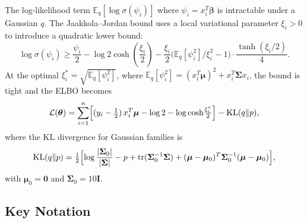 \documentclass[11pt,a4paper]{article}
\newcommand{\E}{\mathbb{E}}
\newcommand{\tr}{\text{tr}}
\begin{document}
The log-likelihood term $\E_q[\log\sigma(\psi_i)]$ where $\psi_i = x_i^T\bm{\beta}$
is intractable under a Gaussian $q$.
The Jaakkola--Jordan bound uses a local variational parameter $\xi_i > 0$ to introduce
a quadratic lower bound:
\begin{equation}
  \log\sigma(\psi_i) \geq \frac{\psi_i}{2} - \log 2\cosh\!\left(\frac{\xi_i}{2}\right)
  - \frac{\xi_i}{2}\bigl(\E_q[\psi_i^2]/\xi_i^2 - 1\bigr) \cdot \frac{\tanh(\xi_i/2)}{4}.
\end{equation}
At the optimal $\xi_i^* = \sqrt{\E_q[\psi_i^2]}$, where
$\E_q[\psi_i^2] = (x_i^T\bm{\mu})^2 + x_i^T\bm{\Sigma} x_i$,
the bound is tight and the ELBO becomes
\begin{equation}\label{eq:elbo}
  \mathcal{L}(\bm{\theta}) = \sum_{i=1}^{n}
  \Bigl[(y_i - \tfrac{1}{2})\,x_i^T\bm{\mu}
        - \log 2 - \log\cosh\!\tfrac{\xi_i^*}{2}\Bigr]
  - \mathrm{KL}(q\|p),
\end{equation}
where the KL divergence for Gaussian families is
\begin{equation}
  \mathrm{KL}(q\|p) = \tfrac{1}{2}\Bigl[
    \log\frac{|\bm{\Sigma}_0|}{|\bm{\Sigma}|}
    - p + \tr(\bm{\Sigma}_0^{-1}\bm{\Sigma})
    + (\bm{\mu}-\bm{\mu}_0)^T\bm{\Sigma}_0^{-1}(\bm{\mu}-\bm{\mu}_0)
  \Bigr],
\end{equation}
with $\bm{\mu}_0=\bm{0}$ and $\bm{\Sigma}_0 = 10\bm{I}$.

\subsection{Key Notation}
\end{document}
